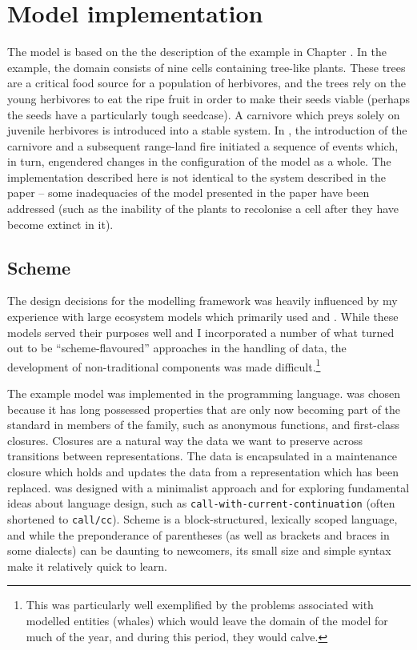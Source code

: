 \section{Model implementation}

The model is based on the the description of the example in Chapter
\Cthree. In the example, the domain consists of nine cells containing
tree-like plants. These trees are a critical food source for a
population of herbivores, and the trees rely on the young herbivores
to eat the ripe fruit in order to make their seeds viable (perhaps the
seeds have a particularly tough seedcase). A carnivore which preys
solely on juvenile herbivores is introduced into a stable system.
In \Cthree, the introduction of the carnivore and a subsequent
range-land fire initiated a sequence of events which, in turn,
engendered changes in the configuration of the model as a whole.  The
implementation described here is not identical to the system described
in the paper -- some inadequacies of the model presented in the paper
have been addressed (such as the inability of the plants to recolonise
a cell after they have become extinct in it).


\subsection{Scheme}
The design decisions for the modelling framework was heavily
influenced by my experience with large ecosystem models which
primarily used \Cpp and \CC.  While these models served their purposes
well and I incorporated a number of what turned out to be
``scheme-flavoured'' approaches in the handling of data, the
development of non-traditional components was made
difficult.\footnote{This was particularly well exemplified by the
problems associated with modelled entities (whales) which would leave
the domain of the model for much of the year, and during this period,
they would calve.}

The example model was implemented in the \Scheme programming language.
\Scheme was chosen because it has long possessed properties that are
only now becoming part of the standard in members of the \CC family,
such as anonymous functions, and first-class closures. Closures are a
natural way the data we want to preserve across transitions between
representations. The data is encapsulated in a maintenance
closure which holds and updates the data from a
representation which has been replaced. \Scheme was designed with a
minimalist approach and for exploring fundamental ideas about language
design, such as \texttt{call-with-current-continuation} (often
shortened to \texttt{call/cc}).  Scheme is a block-structured,
lexically scoped language, and while the preponderance of parentheses
(as well as brackets and braces in some dialects) can be daunting to
newcomers, its small size and simple syntax make it relatively quick
to learn.

